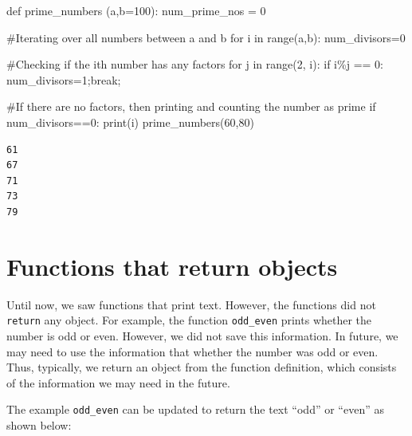 \documentclass[
  letterpaper,
  DIV=11,
  numbers=noendperiod]{scrreprt}
\newenvironment{Shaded}{\begin{snugshade}}{\end{snugshade}}
\newcommand{\BuiltInTok}[1]{\textcolor[rgb]{0.00,0.23,0.31}{#1}}
\newcommand{\CommentTok}[1]{\textcolor[rgb]{0.37,0.37,0.37}{#1}}
\newcommand{\ControlFlowTok}[1]{\textcolor[rgb]{0.00,0.23,0.31}{#1}}
\newcommand{\DecValTok}[1]{\textcolor[rgb]{0.68,0.00,0.00}{#1}}
\newcommand{\KeywordTok}[1]{\textcolor[rgb]{0.00,0.23,0.31}{#1}}
\newcommand{\NormalTok}[1]{\textcolor[rgb]{0.00,0.23,0.31}{#1}}
\newcommand{\OperatorTok}[1]{\textcolor[rgb]{0.37,0.37,0.37}{#1}}
\begin{document}
\begin{Shaded}
\begin{Highlighting}[]
\KeywordTok{def}\NormalTok{ prime\_numbers (a,b}\OperatorTok{=}\DecValTok{100}\NormalTok{):}
\NormalTok{    num\_prime\_nos }\OperatorTok{=} \DecValTok{0}
    
    \CommentTok{\#Iterating over all numbers between a and b}
    \ControlFlowTok{for}\NormalTok{ i }\KeywordTok{in} \BuiltInTok{range}\NormalTok{(a,b):}
\NormalTok{        num\_divisors}\OperatorTok{=}\DecValTok{0}
        
        \CommentTok{\#Checking if the ith number has any factors}
        \ControlFlowTok{for}\NormalTok{ j }\KeywordTok{in} \BuiltInTok{range}\NormalTok{(}\DecValTok{2}\NormalTok{, i):}
            \ControlFlowTok{if}\NormalTok{ i}\OperatorTok{\%}\NormalTok{j }\OperatorTok{==} \DecValTok{0}\NormalTok{:}
\NormalTok{                num\_divisors}\OperatorTok{=}\DecValTok{1}\OperatorTok{;}\ControlFlowTok{break}\OperatorTok{;}
                
        \CommentTok{\#If there are no factors, then printing and counting the number as prime        }
        \ControlFlowTok{if}\NormalTok{ num\_divisors}\OperatorTok{==}\DecValTok{0}\NormalTok{:}
            \BuiltInTok{print}\NormalTok{(i)}
\NormalTok{prime\_numbers(}\DecValTok{60}\NormalTok{,}\DecValTok{80}\NormalTok{)}
\end{Highlighting}
\end{Shaded}

\begin{verbatim}
61
67
71
73
79
\end{verbatim}

\hypertarget{functions-that-return-objects}{%
\section{Functions that return
objects}\label{functions-that-return-objects}}

Until now, we saw functions that print text. However, the functions did
not \texttt{return} any object. For example, the function
\texttt{odd\_even} prints whether the number is odd or even. However, we
did not save this information. In future, we may need to use the
information that whether the number was odd or even. Thus, typically, we
return an object from the function definition, which consists of the
information we may need in the future.

The example \texttt{odd\_even} can be updated to return the text ``odd''
or ``even'' as shown below:
\end{document}

